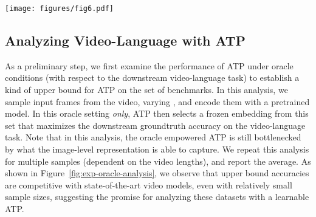 \begin{figure*}[t]
\begin{center}
\centerline{\texttt{[image: figures/fig6.pdf]}}
\vskip -0.1in
\caption{\textbf{ATP analysis (qualitative results).} We visualize example videos from the NExT-QA dataset \cite{xiao2021next}, along with the selections ATP made from a random sparse sample of frames. Both questions shown here are examples of ``causal-how'' questions in the dataset (shown with the top-4 answer options, for clarity). \textbf{(a)} We find that our ATP model can select informative frames for the downstream Video QA task, when possible, and that many questions initially intended to assess causal or temporal understanding can be answered from single-frame semantics. \textbf{(b)} Conversely, for (video, question) inputs that necessitate a deeper \textit{multi-frame} understanding of event relationships or dynamics, ATP's selected embedding is insufficient to answer the query. See Sec.~\ref{sec:exp:atp} (additional visuals and datasets in supplement).
}
\label{fig:exp-nextqa-qual}
\end{center}
\vskip -0.3in
\end{figure*}


\subsection{Analyzing Video-Language with ATP}
\label{sec:exp:atp}

 As a preliminary step, we first examine the performance of ATP under oracle conditions (with respect to the downstream video-language task) to establish a kind of upper bound for ATP on the set of benchmarks. In this analysis, we sample  input frames from the video, varying , and encode them with a pretrained model. In this oracle setting \textit{only}, ATP then selects a frozen embedding from this set that maximizes the downstream groundtruth accuracy on the video-language task. Note that in this analysis, the oracle empowered ATP is still bottlenecked by what the image-level representation is able to capture. We repeat this analysis for multiple samples (dependent on the video lengths), and report the average. As shown in Figure~\ref{fig:exp-oracle-analysis}, we observe that upper bound accuracies are competitive with state-of-the-art video models, even with relatively small  sample sizes, suggesting the promise for analyzing these datasets with a learnable ATP.

